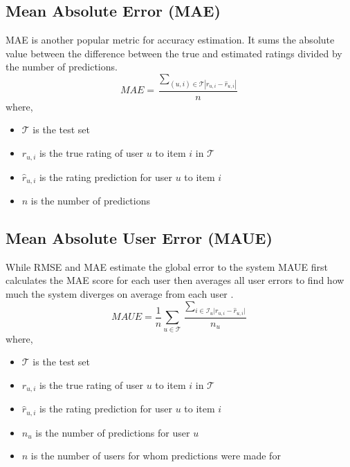 \subsection{Mean Absolute Error (MAE)}
MAE is another popular metric for accuracy estimation. It sums the absolute
value between the difference between the true and estimated ratings
divided by the number of predictions. \citep{Ricci}
$$MAE = \frac{\sum_{(u,i) \in \mathcal{T}\left|r_{u,i} - \hat{r}_{u,i}\right|}}{n}$$
where,
\begin{itemize}
	\item[] $\mathcal{T}$ is the test set
	\item[] $r_{u,i}$ is the true rating of user $u$ to item $i$ in $\mathcal{T}$
	\item[] $\hat{r}_{u,i}$ is the rating prediction for user $u$ to item $i$
	\item[] $n$ is the number of predictions
\end{itemize}

\subsection{Mean Absolute User Error (MAUE)}
While RMSE and MAE estimate the global error to the system MAUE first
calculates the MAE score for each user then averages all user errors to find
how much the system diverges on average from each user \citep{Massa}.
$$MAUE = \frac{1}{n}\sum_{u \in \mathcal{T}}\frac{\sum_{i \in \mathcal{I}_u\mathopen|r_{u,i} - \hat{r}_{u,i}\mathclose|}}{n_u}$$
where,
\begin{itemize}
	\item[] $\mathcal{T}$ is the test set
	\item[] $r_{u,i}$ is the true rating of user $u$ to item $i$ in $\mathcal{T}$
	\item[] $\hat{r}_{u,i}$ is the rating prediction for user $u$ to item $i$
	\item[] $n_u$ is the number of predictions for user $u$
	\item[] $n$ is the number of users for whom predictions were made for
\end{itemize}
